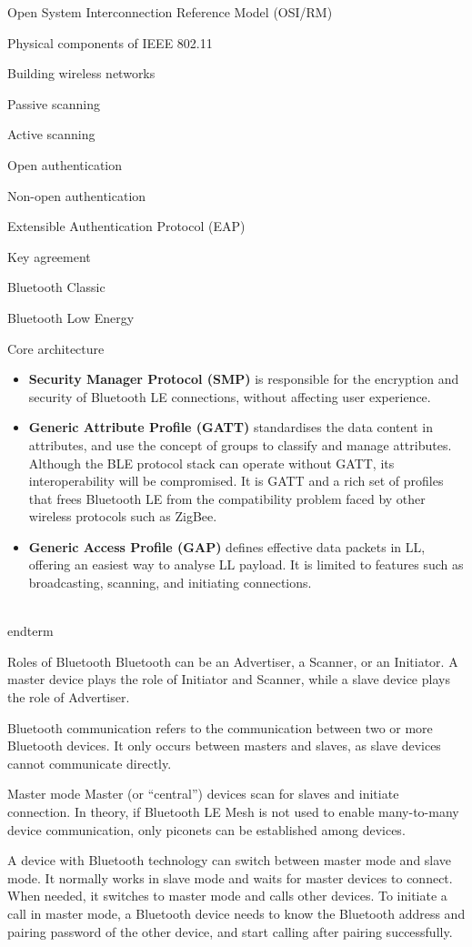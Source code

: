 \documentclass[a4paper,12pt]{book}
\begin{document}
\begin{term}{Open System Interconnection Reference Model (OSI/RM)}
\begin{term}{Physical components of IEEE 802.11}
\begin{term}{Building wireless networks}
\begin{term}{Passive scanning}
\begin{term}{Active scanning}
\begin{term}{Open authentication}
\begin{term}{Non-open authentication}
\begin{term}{Extensible Authentication Protocol (EAP)}
\begin{term}{Key agreement}
\begin{term}{Bluetooth Classic}
\begin{term}{Bluetooth Low Energy}
\begin{term}{Core architecture}
\begin{itemize}
        \item \textbf{Security Manager Protocol (SMP)} is responsible for the encryption and security of Bluetooth LE connections, without affecting user experience.
        \item \textbf{Generic Attribute Profile (GATT)} standardises the data content in attributes, and use the concept of groups to classify and manage attributes. Although the BLE protocol stack can operate without GATT, its interoperability will be compromised. It is GATT and a rich set of profiles that frees Bluetooth LE from the compatibility problem faced by other wireless protocols such as ZigBee.
        \item \textbf{Generic Access Profile (GAP)} defines effective data packets in LL, offering an easiest way to analyse LL payload. It is limited to features such as broadcasting, scanning, and initiating connections. 
    \end{itemize}
\\end{term}{}

\begin{term}{Roles of Bluetooth}
    Bluetooth can be an Advertiser, a Scanner, or an Initiator. A master device plays the role of Initiator and Scanner, while a slave device plays the role of Advertiser.
    
    Bluetooth communication refers to the communication between two or more Bluetooth devices. It only occurs between masters and slaves, as slave devices cannot communicate directly.

    \parskip 6pt
    \begin{secterm}{Master mode}
        Master (or “central”) devices scan for slaves and initiate connection. In theory, if Bluetooth LE Mesh is not used to enable many-to-many device communication, only piconets can be established among devices.
        
        \parskip 6pt
        A device with Bluetooth technology can switch between master mode and slave mode. It normally works in slave mode and waits for master devices to connect. When needed, it switches to master mode and calls other devices. To initiate a call in master mode, a Bluetooth device needs to know the Bluetooth address and pairing password of the other device, and start calling after pairing successfully.
    \end{secterm}


\end{term}
\end{term}
\end{term}
\end{term}
\end{term}
\end{term}
\end{term}
\end{term}
\end{term}
\end{term}
\end{term}
\end{term}
\end{term}
\end{document}
